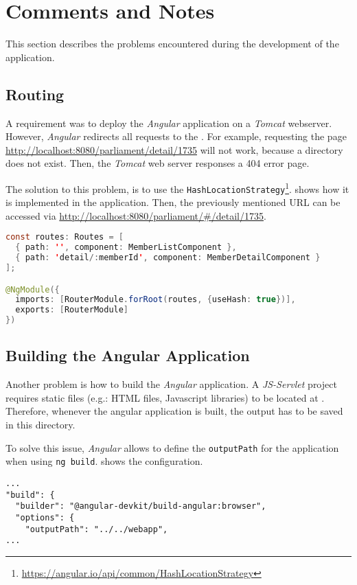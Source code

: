 \section{Comments and Notes}\label{sec:04_comments}
This section describes the problems encountered during the development of the application.


\subsection{Routing}\label{subsec:04_comments_routing}
A requirement was to deploy the \textit{Angular} application on a \textit{Tomcat} webserver. However, \textit{Angular} redirects all requests to the .
For example, requesting the page \url{http://localhost:8080/parliament/detail/1735} will not work, because a directory  does not exist. Then, the \textit{Tomcat} web server responses a 404 error page.

The solution to this problem, is to use the \texttt{HashLocationStrategy}\footnote{\url{https://angular.io/api/common/HashLocationStrategy}}.  shows how it is implemented in the application.
Then, the previously mentioned URL can be accessed via \url{http://localhost:8080/parliament/#/detail/1735}.
\begin{lstlisting}[label=lst:04_comments_routing_hashrouting, caption=Application routing configuration of \texttt{app-routing.module.ts}, language=java]
const routes: Routes = [
  { path: '', component: MemberListComponent },
  { path: 'detail/:memberId', component: MemberDetailComponent }
];

@NgModule({
  imports: [RouterModule.forRoot(routes, {useHash: true})],
  exports: [RouterModule]
})
\end{lstlisting}


\subsection{Building the Angular Application}\label{subsec:04_comments_building}
Another problem is how to build the \textit{Angular} application.
A \textit{JS-Servlet} project requires static files (e.g.: HTML files, Javascript libraries) to be located at .
Therefore, whenever the angular application is built, the output has to be saved in this directory.

To solve this issue, \textit{Angular} allows to define the \texttt{outputPath} for the application when using \texttt{ng build}.  shows the  configuration.
\begin{lstlisting}[label=lst:04_comments_building_config, caption=\texttt{angular.json} configuration]
...
"build": {
  "builder": "@angular-devkit/build-angular:browser",
  "options": {
    "outputPath": "../../webapp",
...
\end{lstlisting}


